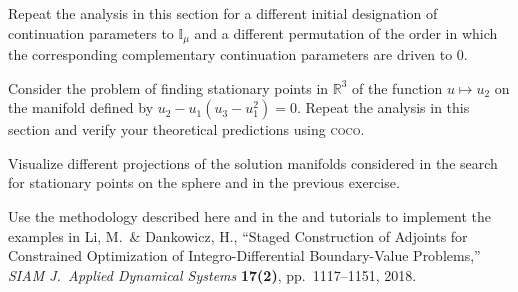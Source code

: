 \begin{exercises}
\item Repeat the analysis in this section for a different initial designation of continuation parameters to $\mathbb{I}_\mu$ and a different permutation of the order in which the corresponding complementary continuation parameters are driven to $0$.
\item Consider the problem of finding stationary points in $\mathbb{R}^3$ of the function $u\mapsto u_2$ on the manifold defined by $u_2-u_1(u_3-u_1^2)=0$. Repeat the analysis in this section and verify your theoretical predictions using \textsc{coco}.
\item Visualize different projections of the solution manifolds considered in the search for stationary points on the sphere and in the previous exercise.
\item Use the methodology described here and in the  and  tutorials to implement the examples in Li, M.~\& Dankowicz, H., ``Staged Construction of Adjoints for Constrained Optimization of Integro-Differential Boundary-Value Problems,'' \emph{SIAM J.~Applied Dynamical Systems} \textbf{17(2)}, pp.~1117--1151, 2018.
\end{exercises}

